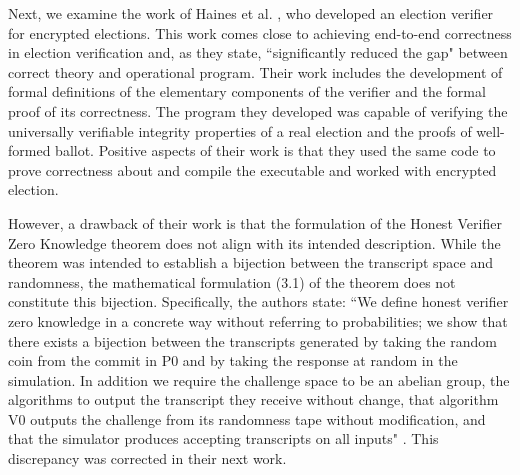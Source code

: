 Next, we examine the work of \label{Haines} Haines et al. \cite{Haines2019VerifiedVF}, who developed an election verifier for encrypted elections. This work comes close to achieving end-to-end correctness in election verification and, as they state, ``significantly reduced the gap" between correct theory and operational program. Their work includes the development of formal definitions of the elementary components of the verifier and the formal proof of its correctness. The program they developed was capable of verifying the universally verifiable integrity properties of a real election and the proofs of well-formed ballot. Positive aspects of their work is that they used the same code to prove correctness about and compile the executable and worked with encrypted election.

However, a drawback of their work is that the formulation of the Honest Verifier Zero Knowledge theorem does not align with its intended description. While the theorem was intended to establish a bijection between the transcript space and randomness, the mathematical formulation (3.1) of the theorem does not constitute this bijection. Specifically, the authors state: ``We define honest verifier zero knowledge in a concrete way without referring to probabilities; we show that there exists a bijection between the transcripts generated by taking the random coin from the commit in P0 and by taking the response at random in the simulation. In addition we require the challenge space to be an abelian group, the algorithms to output the transcript they receive without change, that algorithm V0 outputs the challenge from its randomness tape without modification, and that the simulator produces accepting transcripts on all inputs" \cite{Haines2019VerifiedVF}. This discrepancy was corrected in their next work.


